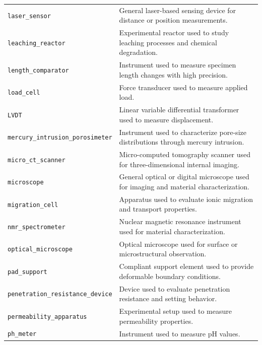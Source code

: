 \documentclass[11pt]{book}
\begin{document}
{\begin{longtable}{p{}p{}}
\texttt{laser\_sensor} &
General laser-based sensing device for distance or position measurements. \\

\texttt{leaching\_reactor} &
Experimental reactor used to study leaching processes and chemical degradation. \\

\texttt{length\_comparator} &
Instrument used to measure specimen length changes with high precision. \\

\texttt{load\_cell} &
Force transducer used to measure applied load. \\

\texttt{LVDT} &
Linear variable differential transformer used to measure displacement. \\

\texttt{mercury\_intrusion\_porosimeter} &
Instrument used to characterize pore-size distributions through mercury intrusion. \\

\texttt{micro\_ct\_scanner} &
Micro-computed tomography scanner used for three-dimensional internal imaging. \\

\texttt{microscope} &
General optical or digital microscope used for imaging and material characterization. \\

\texttt{migration\_cell} &
Apparatus used to evaluate ionic migration and transport properties. \\

\texttt{nmr\_spectrometer} &
Nuclear magnetic resonance instrument used for material characterization. \\

\texttt{optical\_microscope} &
Optical microscope used for surface or microstructural observation. \\

\texttt{pad\_support} &
Compliant support element used to provide deformable boundary conditions. \\

\texttt{penetration\_resistance\_device} &
Device used to evaluate penetration resistance and setting behavior. \\

\texttt{permeability\_apparatus} &
Experimental setup used to measure permeability properties. \\

\texttt{ph\_meter} &
Instrument used to measure pH values. \\


\end{longtable}}
\end{document}
